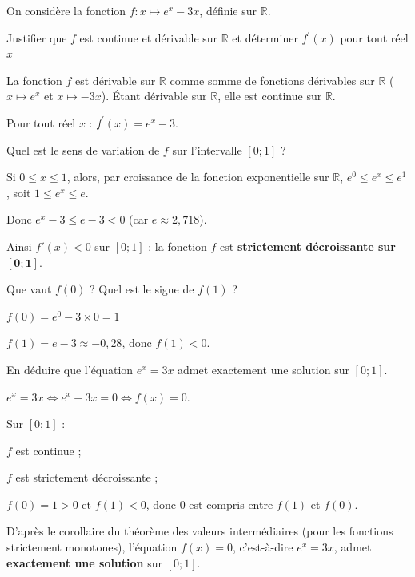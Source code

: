 \documentclass[11pt,a4paper]{article}  %
\begin{document}
	On considère la fonction $f: x \mapsto e^x-3 x$, définie sur $\mathbb{R}$.
	\begin{enumMet}
		\item Justifier que $f$ est continue et dérivable sur $\mathbb{R}$ et déterminer $f^{\prime}(x)$ pour tout réel $x$
		
		\begin{corrBox}
			La fonction $f$ est dérivable sur $\mathbb{R}$ comme somme de fonctions dérivables sur $\mathbb{R}$ ($x\mapsto e^x$ et $x\mapsto -3x$). Étant dérivable sur $\mathbb{R}$, elle est continue sur $\mathbb{R}$.
			
			Pour tout réel $x$ : $f^{\prime}(x)=e^x-3$.
		\end{corrBox}
		
		\item Quel est le sens de variation de $f$ sur l'intervalle $[0 ; 1]$ ?
		
		\begin{corrBox}
			Si $0 \leqslant x \leqslant 1$, alors, par croissance de la fonction exponentielle sur $\mathbb{R}$, $e^0 \leqslant e^x \leqslant e^1$, soit $1\leqslant e^x\leqslant e$.
			
			Donc $e^x-3 \leqslant e-3<0$ (car $e\approx 2{,}718$).
			
			Ainsi $f'(x)<0$ sur $[0;1]$ : la fonction $f$ est \textbf{strictement décroissante sur $\bm{[0 ; 1]}$}.
		\end{corrBox}
		
		\item Que vaut $f(0)$ ? Quel est le signe de $f(1)$ ?
		
		\begin{corrBox}
			$f(0)=e^0-3\times 0=1$
			
			$f(1)=e-3\approx-0{,}28$, donc $f(1)<0$.
		\end{corrBox}
		
		\item En déduire que l'équation $e^x=3 x$ admet exactement une solution sur $[0 ; 1]$.
		
		\begin{corrBox}
			$e^x=3x \iff e^x-3x=0\iff f(x)=0$.
			
			Sur $[0;1]$ :
			\begin{itemMet}
				\item $f$ est continue ;
				\item $f$ est strictement décroissante ;
				\item $f(0)=1>0$ et $f(1)<0$, donc $0$ est compris entre $f(1)$ et $f(0)$.
			\end{itemMet}
			D'après le corollaire du théorème des valeurs intermédiaires (pour les fonctions strictement monotones), l'équation $f(x)=0$, c'est-à-dire $e^x=3x$, admet \textbf{exactement une solution} sur $[0;1]$.
		\end{corrBox}
	\end{enumMet}
	
\end{document}
